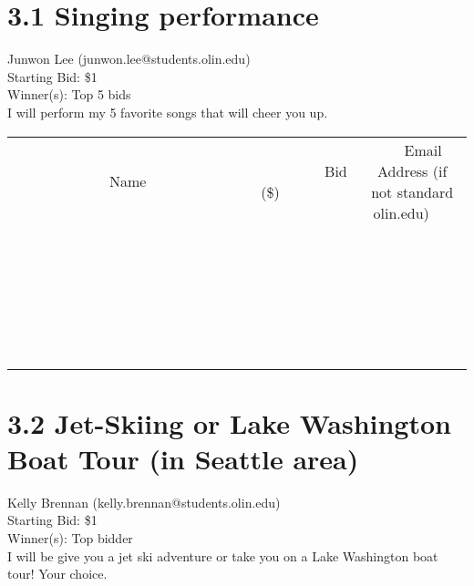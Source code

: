 \documentclass[11pt]{article}
\begin{document}
\section*{3.1 Singing performance}
Junwon Lee (junwon.lee@students.olin.edu) \\
Starting Bid: \$1 \\
Winner(s): 
Top 5 bids \\
I will perform my 5 favorite songs that will cheer you up. \\[6ex]
\begin{tabular}{c c c}
~~~~~~~~~~~~~Name~~~~~~~~~~~~~ & ~~~~~~~~~Bid (\$)~~~~~~~~~ & ~~~Email Address (if not standard olin.edu)~~~ \\
 & & \\
\hline
 & & \\
\hline
 & & \\
\hline
 & & \\
\hline
 & & \\
\hline
 & & \\
\hline
 & & \\
\hline
 & & \\
\hline
 & & \\
\hline
 & & \\
\hline
 & & \\
\hline
 & & \\
\hline
 & & \\
\hline
 & & \\
\hline
 & & \\
\hline
 & & \\
\hline
 & & \\
\hline
 & & \\
\hline
 & & \\
\hline
 & & \\
\hline
 & & \\
\hline
 & & \\
\hline
 & & \\
\hline
 & & \\
\hline
 & & \\
\hline
 & & \\
\hline
\end{tabular}
\clearpage
\section*{3.2 Jet-Skiing or Lake Washington Boat Tour (in Seattle area)}
Kelly Brennan (kelly.brennan@students.olin.edu) \\
Starting Bid: \$1 \\
Winner(s): 
Top bidder \\
I will be give you a jet ski adventure or take you on a Lake Washington boat tour! Your choice. 
\end{document}
